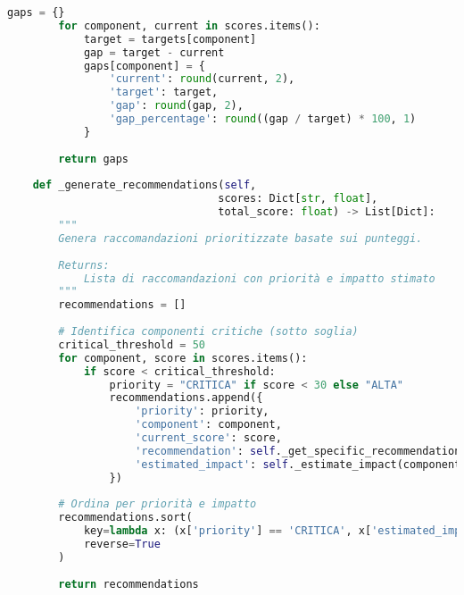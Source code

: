 \begin{lstlisting}[language=Python, caption={Implementazione completa GIST Calculator con validazione e reporting}]
        gaps = {}
        for component, current in scores.items():
            target = targets[component]
            gap = target - current
            gaps[component] = {
                'current': round(current, 2),
                'target': target,
                'gap': round(gap, 2),
                'gap_percentage': round((gap / target) * 100, 1)
            }
        
        return gaps
    
    def _generate_recommendations(self, 
                                 scores: Dict[str, float],
                                 total_score: float) -> List[Dict]:
        """
        Genera raccomandazioni prioritizzate basate sui punteggi.
        
        Returns:
            Lista di raccomandazioni con priorità e impatto stimato
        """
        recommendations = []
        
        # Identifica componenti critiche (sotto soglia)
        critical_threshold = 50
        for component, score in scores.items():
            if score < critical_threshold:
                priority = "CRITICA" if score < 30 else "ALTA"
                recommendations.append({
                    'priority': priority,
                    'component': component,
                    'current_score': score,
                    'recommendation': self._get_specific_recommendation(component, score),
                    'estimated_impact': self._estimate_impact(component, score)
                })
        
        # Ordina per priorità e impatto
        recommendations.sort(
            key=lambda x: (x['priority'] == 'CRITICA', x['estimated_impact']),
            reverse=True
        )
        
        return recommendations
    

\end{lstlisting}

